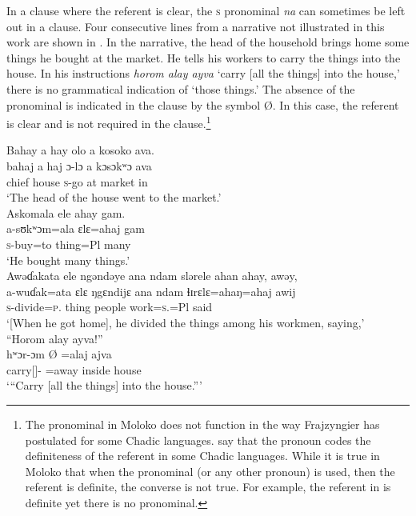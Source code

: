 In a clause where the referent is clear, the \textsc{s} \DO pronominal \textit{na} can sometimes be left out in a clause. Four consecutive lines from a narrative not illustrated in this work are shown in . In the narrative, the head of the household brings home some things he bought at the market. He tells his workers to carry the things into the house. In his instructions \textit{horom alay ayva} ‘carry [all the things] into the house,’ there is no grammatical indication of ‘those things.’ The absence of the \DO pronominal is indicated in the clause by the symbol Ø. In this case, the referent is clear and is not required in the clause.\footnote{The \DO pronominal in Moloko does not function in the way Frajzyngier has postulated for some Chadic languages. \citet{FrajzyngierShay2008} say that the \DO pronoun codes the definiteness of the referent in some Chadic languages. While it is true in Moloko that when the \DO pronominal (or any other pronoun) is used, then the referent is definite, the converse is not true. For example, the referent in  is definite yet there is no \DO pronominal. } 

\ea\label{ex:7:43}
Bahay  a  hay  olo  a  kosoko  ava.\\   
\gll bahaj a   haj  ɔ{}-lɔ  a  kɔsɔkʷɔ  ava \\
chief  {\GEN}  house  \textsc{s}-go  at  market  in\\
\glt ‘The head of the house went to the market.’\\
\medskip
Askomala  ele  ahay  gam.\\ 
\gll a-sʊkʷɔm=ala ɛlɛ=ahaj gam\\
\textsc{s}-buy=to    thing=Pl  many\\
\glt ‘He bought many things.’\\
\medskip
Awəɗakata  ele  ngəndəye  ana  ndam  slərele  ahan  ahay,  awəy,\\ 
\gll a-wuɗak=ata ɛlɛ ŋgɛndijɛ ana ndam ɬɪrɛlɛ=ahaŋ=ahaj awij\\
\textsc{s}-divide=\textsc{p}.{\IO}  thing  {\DEM}  {\DAT} people  work=\textsc{s}.{\POSS}=Pl  said\\
\glt ‘[When he got home], he divided the things among his workmen, saying,’\\
\medskip
“Horom alay  ayva!”\\
\gll hʷɔr-ɔm Ø =alaj ajva\\
carry[{\IMP}]-{\twoP}  {}  =away    {inside house}\\
\glt ‘“Carry [all the things] into the house.”’
\z

